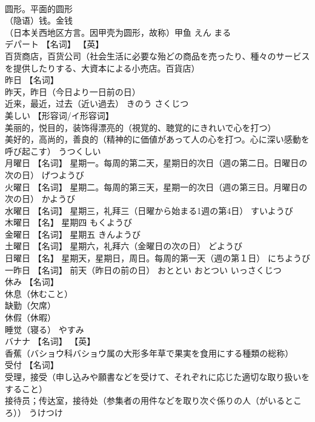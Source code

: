 \documentclass[8pt]{extreport}
\begin{document}
\begin{CJK}{UTF8}{min}
\\	圆形。平面的圆形 
\\	（隐语）钱。金钱 
\\	（日本关西地区方言。因甲壳为圆形，故称）甲鱼	えん まる	
\\	デパート	【名词】 【英】
\\	百货商店，百货公司（社会生活に必要な殆どの商品を売ったり、種々のサービスを提供したりする、大資本による小売店。百貨店）		
\\	昨日	【名词】 
\\	昨天，昨日（今日より一日前の日） 
\\	近来，最近，过去（近い過去）	きのう さくじつ	
\\	美しい	【形容词/イ形容词】 
\\	美丽的，悦目的，装饰得漂亮的（視覚的、聴覚的にきれいで心を打つ） 
\\	美好的，高尚的，善良的（精神的に価値があって人の心を打つ。心に深い感動を呼び起こす）	うつくしい	
\\	月曜日	【名词】 星期一。每周的第二天，星期日的次日（週の第二日。日曜日の次の日）	げつようび	
\\	火曜日	【名词】 星期二。每周的第三天，星期一的次日（週の第三日。月曜日の次の日）	かようび	
\\	水曜日	【名词】 星期三，礼拜三（日曜から始まる1週の第4日）	すいようび	
\\	木曜日	【名】 星期四	もくようび	
\\	金曜日	【名词】 星期五	きんようび	
\\	土曜日	【名词】 星期六，礼拜六（金曜日の次の日）	どようび	
\\	日曜日	【名】 星期天，星期日，周日。每周的第一天（週の第１日）	にちようび	
\\	一昨日	【名词】 前天（昨日の前の日）	おととい おとつい いっさくじつ	
\\	休み	【名词】 
\\	休息（休むこと） 
\\	缺勤（欠席） 
\\	休假（休暇） 
\\	睡觉（寝る）	やすみ	
\\	バナナ	【名词】 【英】
\\	香蕉（バショウ科バショウ属の大形多年草で果実を食用にする種類の総称）		
\\	受付	【名词】 
\\	受理，接受（申し込みや願書などを受けて、それぞれに応じた適切な取り扱いをすること） 
\\	接待员；传达室，接待处（参集者の用件などを取り次ぐ係りの人（がいるところ））	うけつけ	

\end{CJK}
\end{document}
